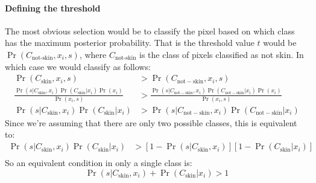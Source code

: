 \paragraph{Defining the threshold}
The most obvious selection would be to classify the pixel based on which class has the maximum posterior probability. That is the threshold value $t$ would be $\Pr(C_\text{not-skin}, x_i, s)$, where $C_\text{not-skin}$ is the class of pixels classified as not skin. In which case we would classify as follows:
\begin{align*}
    \Pr(C_\mathrm{skin}, x_i, s) &> \Pr(C_\mathrm{not-skin}, x_i, s) \\
    \frac{\Pr(s|C_\mathrm{skin}, x_i)\Pr(C_\mathrm{skin}|x_i)\Pr(x_i)}{\Pr(x_i,s)} &> \frac{\Pr(s|C_\mathrm{not-skin}, x_i)\Pr(C_\mathrm{not-skin}|x_i)\Pr(x_i)}{\Pr(x_i,s)} \\
    \Pr(s|C_\mathrm{skin}, x_i)\Pr(C_\mathrm{skin}|x_i) &> \Pr(s|C_\mathrm{not-skin}, x_i)\Pr(C_\mathrm{not-skin}|x_i) 
\end{align*} 
Since we're assuming that there are only two possible classes, this is equivalent to: 
\begin{align*}
    \Pr(s|C_\mathrm{skin}, x_i)\Pr(C_\mathrm{skin}|x_i) &> [1-\Pr(s|C_\mathrm{skin}, x_i)][1-\Pr(C_\mathrm{skin}|x_i)] \\
\end{align*}
So an equivalent condition in only a single class is: 
\begin{equation*}
\Pr(s|C_\mathrm{skin}, x_i)+\Pr(C_\mathrm{skin}|x_i) > 1
\end{equation*}
